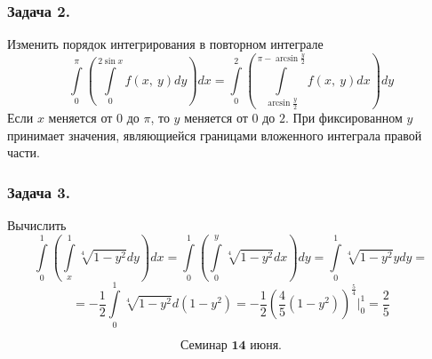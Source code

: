 \documentclass[12pt, letterpaper, twoside]{article}
\begin{document}
\subsubsection*{Задача 2.}
Изменить порядок интегрирования в повторном интеграле
\[\int\limits_0^{\pi} \left( \int\limits_0^{2\sin x} f(x,\ y) dy \right) dx = \int\limits_0^2 \left( \int\limits_{\arcsin \frac{y}{2}}^{\pi - \arcsin \frac{y}{2}} f(x,\ y) dx \right) dy\]
Если $x$ меняется от $0$ до $\pi$, то $y$ меняется от $0$ до $2$. При фиксированном $y$ принимает значения, являющиейся границами вложенного интеграла правой части.
\subsubsection*{Задача 3.}
Вычислить
\[\int\limits_0^1 \left(\int\limits_x^1 \sqrt[4]{1 - y^2} dy \right) dx = \int\limits_{0}^1 \left( \int\limits_0^y \sqrt[4]{1 - y^2} dx \right) dy = \int\limits_0^1 \sqrt[4]{{1 - y^2}} ydy =\]
\[= -\frac{1}{2} \int\limits_0^1 \sqrt[4]{1 - y^2} d(1 - y^2) = -\frac{1}{2}\left( \frac{4}{5}(1 - y^2) \right)^{\frac{5}{4}}\bigg|^1_0 = \frac{2}{5}\]

\[\textbf{Семинар 14 июня.}\]
\end{document}
